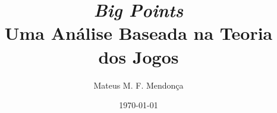 \documentclass[dvipdfm, a4paper, 11pt]{article}
\begin{document}
\title{\textit{Big Points}\\Uma Análise Baseada na Teoria dos Jogos}
\author{Mateus M. F. Mendonça}
\date{\today}
\maketitle
\end{document}
